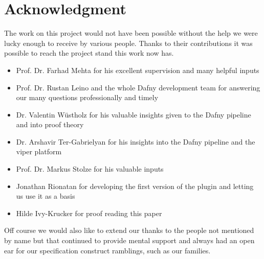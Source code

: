 \section{Acknowledgment}
The work on this project would not have been possible without the help we were lucky enough to receive by various people. Thanks to their contributions it was possible to reach the project stand this work now has.

\begin{itemize}
	\item Prof. Dr. Farhad Mehta for his excellent supervision and many helpful inputs
	\item Prof. Dr. Rustan Leino and the whole Dafny development team for answering our many questions professionally and timely
	\item Dr. Valentin Wüstholz for his valuable insights given to the Dafny pipeline and into proof theory 
	\item Dr. Arshavir Ter-Gabrielyan for his insights into the Dafny pipeline and the viper platform
	\item Prof. Dr. Markus Stolze for his valuable inputs
	\item Jonathan Rionatan for developing the first version of the plugin and letting us use it as a basis
	\item Hilde Ivy-Krucker for proof reading this paper
\end{itemize}
Off course we would also like to extend our thanks to the people not mentioned by name but that continued to provide mental support and always had an open ear for our specification construct ramblings, such as our families. 